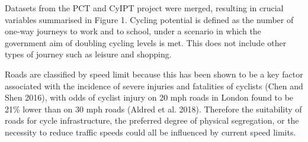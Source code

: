 \documentclass[
]{article}
\begin{document}
Datasets from the PCT and CyIPT project were merged, resulting in crucial variables summarised in Figure 1.
Cycling potential is defined as the number of one-way journeys to work and to school, under a scenario in which the government aim of doubling cycling levels is met.
This does not include other types of journey such as leisure and shopping.

Roads are classified by speed limit because this has been shown to be a key factor associated with the incidence of severe injuries and fatalities of cyclists (Chen and Shen 2016), with odds of cyclist injury on 20 mph roads in London found to be 21\% lower than on 30 mph roads (Aldred et al. 2018).
Therefore the suitability of roads for cycle infrastructure, the preferred degree of physical segregation, or the necessity to reduce traffic speeds could all be influenced by current speed limits.
\end{document}
